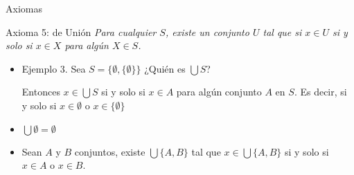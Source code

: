 \documentclass[fc]{tarea}
\begin{document}
\begin{frame}{Axiomas}
    \begin{block}{Axioma 5: de Unión}
        \textit {Para cualquier $S$, existe un conjunto $U$ tal que si $x \in U$ si y solo si $x \in X$ para algún $X \in S$.}
    \end{block}

\vspace{1em}

    \begin{itemize}
        \item Ejemplo 3. Sea $S=\{\emptyset, \{\emptyset\}\}$
        \pause
        ¿Quién es $\bigcup S$?
        \pause
        \vspace{1em}

        Entonces $x \in \bigcup S$ si y solo si $x \in A$ para algún conjunto $A$ en $S$. Es decir, si y solo si $x \in \emptyset$
        o $x \in \{\emptyset\}$
        \item $\bigcup \emptyset = \emptyset$
        \item Sean $A$ y $B$ conjuntos, existe $\bigcup \{A, B \}$ tal que $x \in \bigcup \{A, B \}$ si y solo si
        $x \in A$ o $x \in B$. 
    \end{itemize}

\end{frame}
\end{document}
